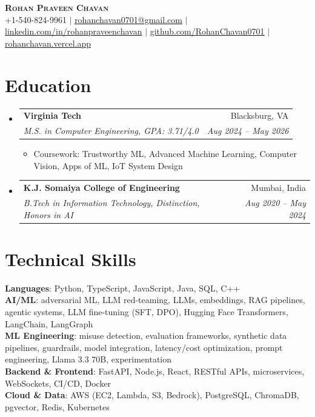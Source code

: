 \documentclass[letterpaper,10pt]{article}
\makeatletter
\newcommand{\resumeItem}[1]{\item\small{#1 \vspace{-2.5pt}}}
\newcommand{\resumeSubheading}[4]{
  \vspace{-2pt}\item
    \begin{tabular*}{0.97\textwidth}[t]{l@{\extracolsep{\fill}}r}
      \textbf{#1} & #2 \\
      \textit{\small#3} & \textit{\small #4} \\
    \end{tabular*}\vspace{-7pt}
}
\newcommand{\resumeSubHeadingListStart}{\begin{itemize}[leftmargin=0.15in, label={}]}
\newcommand{\resumeSubHeadingListEnd}{\end{itemize}}
\newcommand{\resumeItemListStart}{\begin{itemize}}
\newcommand{\resumeItemListEnd}{\end{itemize}\vspace{-5pt}}
\makeatother
\begin{document}
\begin{center}
    \textbf{\Huge \scshape Rohan Praveen Chavan} \\ \vspace{2pt}
    \small +1-540-824-9961 $|$
    \href{mailto:rohanchavan0701@gmail.com}{\underline{rohanchavan0701@gmail.com}} $|$
    \href{https://linkedin.com/in/rohanpraveenchavan}{\underline{linkedin.com/in/rohanpraveenchavan}} $|$
    \href{https://github.com/RohanChavan0701}{\underline{github.com/RohanChavan0701}} $|$
    \href{https://rohanchavan.vercel.app}{\underline{rohanchavan.vercel.app}}
\end{center}

\section{Education}
\resumeSubHeadingListStart
    \resumeSubheading
      {Virginia Tech}{Blacksburg, VA}
      {M.S. in Computer Engineering, GPA: 3.71/4.0}{Aug 2024 -- May 2026}
      \resumeItemListStart
        \resumeItem{Coursework: Trustworthy ML, Advanced Machine Learning, Computer Vision, Apps of ML, IoT System Design}
      \resumeItemListEnd
    \resumeSubheading
      {K.J. Somaiya College of Engineering}{Mumbai, India}
      {B.Tech in Information Technology, Distinction, Honors in AI}{Aug 2020 -- May 2024}
\resumeSubHeadingListEnd

\section{Technical Skills}
\begin{itemize}[leftmargin=0.15in, label={}]
    \small{\item{
     \textbf{Languages}{: Python, TypeScript, JavaScript, Java, SQL, C++} \\
     \textbf{AI/ML}{: adversarial ML, LLM red-teaming, LLMs, embeddings, RAG pipelines, agentic systems,
       LLM fine-tuning (SFT, DPO), Hugging Face Transformers, LangChain, LangGraph} \\
     \textbf{ML Engineering}{: misuse detection, evaluation frameworks, synthetic data pipelines, guardrails,
       model integration, latency/cost optimization, prompt engineering, Llama 3.3 70B, experimentation} \\
     \textbf{Backend \& Frontend}{: FastAPI, Node.js, React, RESTful APIs, microservices,
       WebSockets, CI/CD, Docker} \\
     \textbf{Cloud \& Data}{: AWS (EC2, Lambda, S3, Bedrock), PostgreSQL, ChromaDB, pgvector, Redis, Kubernetes}
    }}
\end{itemize}
\end{document}
